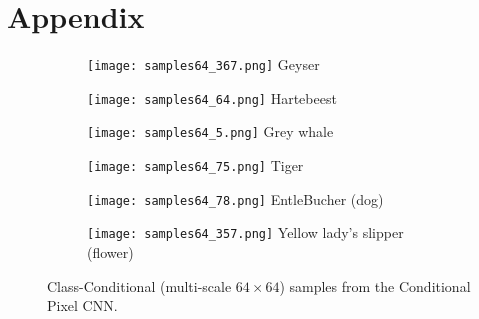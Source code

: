 \documentclass{article}
\begin{document}
\newpage
\section*{Appendix}

\vspace{1cm}
\begin{figure*}[h]

\begin{subfigure}{0.98\textwidth}
  \centering
  \texttt{[image: samples64\_367.png]}
  Geyser
\end{subfigure}\vspace{6pt}
\begin{subfigure}{0.98\textwidth}
  \centering
  \texttt{[image: samples64\_64.png]}
  Hartebeest
\end{subfigure}\vspace{6pt}
\begin{subfigure}{0.98\textwidth}
  \centering
  \texttt{[image: samples64\_5.png]}
  Grey whale
\end{subfigure}\vspace{6pt}
\begin{subfigure}{0.98\textwidth}
  \centering
  \texttt{[image: samples64\_75.png]}
  Tiger
\end{subfigure}\vspace{6pt}
\begin{subfigure}{0.98\textwidth}
  \centering
  \texttt{[image: samples64\_78.png]}
  EntleBucher (dog)
\end{subfigure}\vspace{6pt}
\begin{subfigure}{0.98\textwidth}
  \centering
  \texttt{[image: samples64\_357.png]}
  Yellow lady's slipper (flower)
\end{subfigure}\vspace{6pt}

\caption{Class-Conditional (multi-scale $64 \times 64$) samples from the Conditional Pixel CNN.}
\end{figure*}
\end{document}
